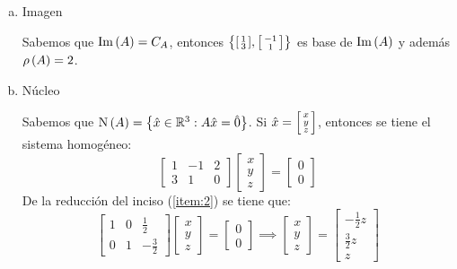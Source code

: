 \begin{solution}
\begin{enumerate}[a)]
	\item Imagen\par 
	Sabemos que $\mim{A} = C_{A}$, entonces $\left\{ \begin{bsmallmatrix}
			1\\
			3
		\end{bsmallmatrix},
		\begin{bsmallmatrix}
			-1\\
			1
	\end{bsmallmatrix} \right\}$ es base de $\mim{A}$ y además $\mrho{A} = 2$.
	\item Núcleo\par 
	Sabemos que $\mnuc{A} =\set{\hat{x}\in\rmath[3]: A\hat{x} = \hat{0}}$. Si $\hat{x} =\begin{bsmallmatrix}
		x\\
		y\\
		z
	\end{bsmallmatrix}$, entonces se tiene el sistema homogéneo:
	\[  
	\begin{bmatrix}
		1 & -1 & 2\\
		3 & 1 & 0
	\end{bmatrix}
	\begin{bmatrix}
		x\\
		y\\
		z
	\end{bmatrix}
	=
	\begin{bmatrix}
		0\\
		0
	\end{bmatrix}
	\]
	De la reducción del inciso (\ref{item:2}) se tiene que:
	\[ \begin{bmatrix}
		1 & 0 & \frac{1}{2}\\
		0 & 1 & -\frac{3}{2}
	\end{bmatrix}
	\begin{bmatrix}
		x\\
		y\\
		z
	\end{bmatrix}
	=
	\begin{bmatrix}
		0\\
		0
	\end{bmatrix}
	\implies
	\begin{bmatrix}
		x\\
		y\\
		z
	\end{bmatrix}
	=
	\begin{bmatrix}
		-\frac{1}{2}z\\
		\frac{3}{2}z\\
		z
	\end{bmatrix}
\]
\end{enumerate}
\end{solution}
